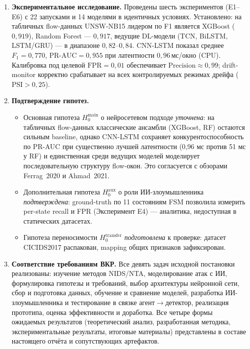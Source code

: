 \begin{enumerate}
    \item \textbf{Экспериментальное исследование.} Проведены шесть
    экспериментов (E1--E6) с 22 запусками и 14 моделями в
    идентичных условиях. Установлено: на табличных flow-данных
    UNSW-NB15 лидером по F1 является XGBoost ($0{,}919$), Random
    Forest --- $0{,}917$, ведущие DL-модели (TCN, BiLSTM,
    LSTM/GRU) --- в диапазоне $0{,}82$--$0{,}84$. CNN-LSTM
    показал среднее $F_1 = 0{,}770$, $\text{PR-AUC} = 0{,}955$
    при латентности $0{,}96$\,мс/окно (CPU). Калибровка под
    целевой $\text{FPR} = 0{,}01$ обеспечивает
    $\text{Precision} \approx 0{,}99$; drift-monitor корректно
    срабатывает на всех контролируемых режимах дрейфа
    ($\text{PSI} > 0{,}25$).

    \item \textbf{Подтверждение гипотез.}
    \begin{itemize}
        \item Основная гипотеза $H_0^{\text{main}}$ о нейросетевом
        подходе \emph{уточнена}: на табличных flow-данных классические
        ансамбли (XGBoost, RF) остаются сильным baseline, однако
        CNN-LSTM сохраняет конкурентоспособность по PR-AUC при
        существенно лучшей латентности (0{,}96 мс против 51 мс у RF)
        и единственная среди ведущих моделей моделирует
        последовательную структуру flow-окон. Это согласуется с
        обзорами Ferrag~2020 и Ahmad~2021.
        \item Дополнительная гипотеза $H_0^{\text{aux}}$ о роли
        ИИ-злоумышленника \emph{подтверждена}: ground-truth по 11
        состояниям FSM позволила измерить per-state recall и FPR
        (Эксперимент E4) --- аналитика, недоступная в статических
        датасетах.
        \item Гипотеза переносимости $H_0^{\text{transfer}}$
        \emph{подготовлена} к проверке: датасет CICIDS2017 распакован,
        mapping общих признаков зафиксирован.
    \end{itemize}

    \item \textbf{Соответствие требованиям ВКР.} Все девять задач
    исходной постановки реализованы: изучение методов NIDS/NTA,
    моделирование атак с ИИ, формулировка гипотезы и требований,
    выбор архитектуры нейронной сети, сбор и подготовка данных,
    обучение и сравнение моделей, разработка ИИ-злоумышленника и
    тестирование в связке агент$\to$детектор, реализация прототипа,
    оценка эффективности и доработка. Все четыре формы ожидаемых
    результатов (теоретический анализ, разработанная методика,
    экспериментальные результаты, итоговые материалы) представлены
    в составе настоящего отчёта и сопутствующих артефактов.
\end{enumerate}

